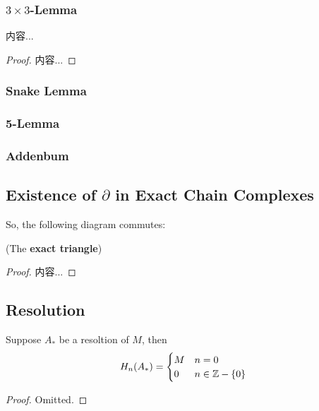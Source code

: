 \documentclass[Total.tex]{subfiles}
\begin{document}
				\subsubsection{$3\times 3$-Lemma}
					\begin{proposition}
						内容...
					\end{proposition}
					\begin{proof}
						内容...
					\end{proof}
				\subsubsection{Snake Lemma}
				\subsubsection{5-Lemma}
				\subsubsection{Addenbum}
			\subsection{Existence of $\partial$ in Exact Chain Complexes}
			So, the following diagram commutes:
			\begin{center}
				\qquad(The \textbf{exact triangle})
			\end{center}
			
			\begin{proposition}
				
			\end{proposition}
			\begin{proof}
				内容...
			\end{proof}
			\subsection{Resolution}
			\begin{proposition}
				Suppose $A_*$ be a resoltion of $M$, then
				\begin{gather*}
					H_n(A_*)=\begin{cases}
						M&n=0\\
						0&n\in \mathbb{Z}-\{0\}
					\end{cases}
				\end{gather*}
			\end{proposition}
			\begin{proof}
				Omitted.
			\end{proof}
\end{document}
